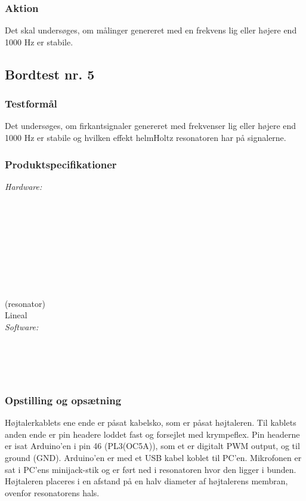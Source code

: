 			\subsubsection{Aktion}
			Det skal undersøges, om målinger genereret med en frekvens lig eller højere end 1000 Hz er stabile. 
			
			\subsection{Bordtest nr. 5} %
		\subsubsection{Testformål}
		Det undersøges, om firkantsignaler genereret med frekvenser lig eller højere end 1000 Hz er stabile og hvilken effekt helmHoltz resonatoren har på signalerne. 
		
		\subsubsection{Produktspecifikationer}
		
		\textit{Hardware:}\\
		\tores\\
		\hojtalerkabel\\
		\kabelsko\\
		\pins\\
		\krympeflex\\
		\arduino\\
		\mikrofon\\
		\PC\\
		\usbkabel\\
		 (resonator)\\
		Lineal\\
	
		\textit{Software:}\\
		\labview\\
		\visa\\
		\vi\\
		\ardsw\\
		
		
		\subsubsection{Opstilling og opsætning}
		
		Højtalerkablets ene ende er påsat kabelsko, som er påsat højtaleren. Til kablets anden ende er pin headere loddet fast og forsejlet med krympeflex. Pin headerne er isat Arduino'en i pin 46 (PL3(OC5A)), som et er digitalt PWM output, og til ground (GND). 
		Arduino'en er med et USB kabel koblet til PC'en.	
		Mikrofonen er sat i PC'ens minijack-stik og er ført ned i resonatoren hvor den ligger i bunden. Højtaleren placeres i en afstand på en halv diameter af højtalerens membran, ovenfor resonatorens hals. 
		

